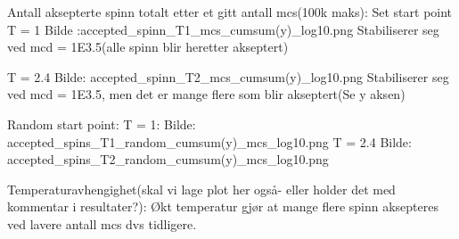 \documentclass[../main.tex]{subfiles}
\begin{document}





Antall aksepterte spinn totalt etter et gitt antall mcs(100k maks):
Set start point
T = 1
Bilde :accepted_spinn_T1_mcs_cumsum(y)_log10.png
Stabiliserer seg ved mcd = 1E3.5(alle spinn blir heretter akseptert)

T = 2.4
Bilde: accepted_spinn_T2_mcs_cumsum(y)_log10.png
Stabiliserer seg ved mcd = 1E3.5, men det er mange flere som blir akseptert(Se y aksen)



Random start point:
T = 1:
Bilde: accepted_spins_T1_random_cumsum(y)_mcs_log10.png
T = 2.4
Bilde: accepted_spins_T2_random_cumsum(y)_mcs_log10.png

Temperaturavhengighet(skal vi lage plot her også- eller holder det med kommentar i resultater?):
Økt temperatur gjør at mange flere spinn aksepteres ved lavere antall mcs dvs tidligere.


\end{document}
